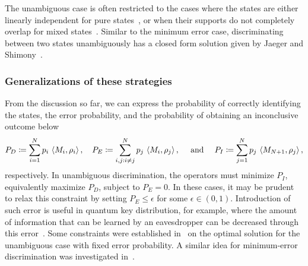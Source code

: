 The unambiguous case is often restricted to the cases where the states are either linearly independent for pure states~\cite{chefles1998unambiguous}, or when their supports do not completely overlap for mixed states~\cite{rudolph2003unambiguous}. 
Similar to the minimum error case, discriminating between two states unambiguously has a closed form solution given by Jaeger and Shimony~\cite{jaeger1995optimal}. 

\subsubsection{Generalizations of these strategies} 
From the discussion so far, we can express the probability of correctly identifying the states, the error probability, and the probability of obtaining an inconclusive outcome below 
\begin{align}
    \label{eq:ch3_QSD-P}
    P_D \coloneqq \sum_{i=1}^N p_i\, \left\langle M_i, \rho_i \right\rangle, \quad P_E \coloneqq \sum_{i,j: i \neq j}^N p_j\, \left\langle M_i, \rho_j \right\rangle, \quad \text{ and } \quad  P_I  \coloneqq \sum_{j=1}^N p_j\, \left\langle M_{N+1}, \rho_j \right\rangle,
\end{align}
respectively. 
In unambiguous discrimination, the operators must minimize $P_I$, equivalently maximize $P_D$, subject to $P_E = 0$.
In these cases, it may be prudent to relax this constraint by setting $P_E \le \epsilon$ for some $\epsilon \in (0, 1)$.
Introduction of such error is useful in quantum key distribution, for example, where the amount of information that can be learned by an eavesdropper can be decreased through this error~\cite{tamaki2003security}.
Some constraints were established in~\cite{touzel2007optimal} on the optimal solution for the unambiguous case with fixed error probability.
A similar idea for minimum-error discrimination was investigated in~\cite{eldar2003mixed}. 

